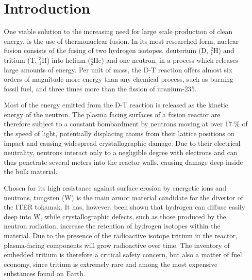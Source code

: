 \chapter{Introduction}

One viable solution to the increasing need for large scale production of clean energy, is the use of thermonuclear fusion. In its most researched form, nuclear fusion consists of the fusing of two hydrogen isotopes, deuterium (D, $^2_1$H) and tritium (T, $^3_1$H) into helium ($^4_2$He) and one neutron, in a process which releases large amounts of energy. Per unit of mass, the D-T reaction offers almost six orders of magnitude more energy than any chemical process, such as burning fossil fuel, and three times more than the fission of uranium-235.  

Most of the energy emitted from the D-T reaction is released as the kinetic energy of the neutron. The plasma facing surfaces of a fusion reactor are therefore subject to a constant bombardment by neutrons moving at over 17 \% of the speed of light, potentially displacing atoms from their lattice positions on impact and causing widespread crystallographic damage. Due to their electrical neutrality, neutrons interact only to a negligible degree with electrons and can thus penetrate several meters into the reactor walls, causing damage deep inside the bulk material. 

Chosen for its high resistance against surface erosion by energetic ions and neutrons, tungsten (W) is the main armor material candidate for the divertor of the ITER tokamak. %
It has, however, been shown that hydrogen can diffuse easily deep into W, while crystallographic defects, such as those produced by the neutron radiation, increase the retention of hydrogen isotopes within the material. \cite{tanabe2014review} 
Due to the presence of the radioactive isotope tritium in the reactor, plasma-facing components will grow radioactive over time. The inventory of embedded tritium is therefore a critical safety concern, but also a matter of fuel economy, since tritium is extremely rare and among the most expensive substances found on Earth.

